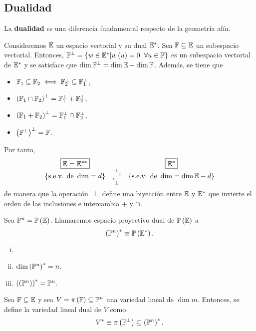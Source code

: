 \subsection{Dualidad}
La \textbf{dualidad} es una diferencia fundamental respecto de la geometría afín.
\begin{rec}
    Consideremos $\mathbb{E}$ un espacio vectorial y su dual $\mathbb{E}^*$. Sea $\mathbb{F} \subseteq \mathbb{E}$ un subespacio vectorial. Entonces, $\F^\perp=\left\{w \in \E ^* | w \left( u \right) = 0 \hspace{0,2cm} \forall u\in\F \right\} $ es un subespacio vectorial de $\mathbb{E}^*$ y se satisface que $\dim \mathbb{F}^\perp = \dim \mathbb{E} - \dim \mathbb{F}$. Además, se tiene que
    \begin{itemize}
        \item $\mathbb{F}_1 \subseteq \mathbb{F}_2 \iff \mathbb{F}_2^\perp \subseteq \mathbb{F}_1^\perp$,
        \item $\left( \mathbb{F}_1 \cap \mathbb{F}_2 \right) ^\perp = \mathbb{F}_1^\perp + \mathbb{F}_2^\perp$,
        \item $\left( \mathbb{F}_1 + \mathbb{F}_2 \right)^\perp=\mathbb{F}_1^\perp \cap \mathbb{F}_2^\perp$,
        \item $\left( \mathbb{F}^\perp\right)^\perp=\mathbb{F}$.
    \end{itemize}
    Por tanto,
    \[
        \begin{array}{ccc}
             \boxed{\mathbb{E} = \mathbb{E}^{**}} & & \boxed{\mathbb{E}^*}\\
             \left\{\text{s.e.v. de }\dim = d \right\} & \substack{\perp \\ \longrightarrow \\  \longleftarrow \\ \perp} & \left\{\text{s.e.v. de }\dim = \dim \mathbb{E} - d \right\}
        \end{array}
    \]
    de manera que la operación $\perp$ define una biyección entre $\mathbb{E}$ y $\mathbb{E}^*$ que invierte el orden de las inclusiones e intercambia $+$ y $\cap$.
\end{rec}
\begin{defi}
    Sea $\mathbb{P}^n=\mathbb{P}\left(\mathbb{E}\right)$. Llamaremos espacio proyectivo dual de $\mathbb{P}\left(\mathbb{E}\right)$ a
    \[
        \left( \mathbb{P}^n \right)^* \equiv \mathbb{P}\left(\mathbb{E}^*\right).
    \]
\end{defi}
\begin{obs}
    \begin{enumerate}[(i)]
        \item []
        \item $\dim \left( \mathbb{P} ^n \right) ^* = n$.
        \item $\left( \left( \mathbb{P} ^n \right) \right) ^* = \mathbb{P}^n. $
    \end{enumerate}
\end{obs}
\begin{defi}
    Sea $\mathbb{F}\subseteq \mathbb{E}$ y sea $V=\pi\left(\mathbb{F}\right)\subseteq\mathbb{P}^n$ una variedad lineal de $\dim m$. Entonces, se define la variedad lineal dual de $V$ como
    \[
        V^* \equiv \pi \left( \mathbb{F}^\perp\right) \subseteq \left( \mathbb{P}^n \right)^*.
    \]
    
\end{defi}

